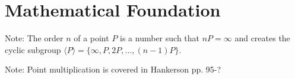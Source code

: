 \section{Mathematical Foundation}

Note: The order \(n\) of a point \(P\) is a number such that \(nP = \infty\) and creates
the cyclic subgroup \(\langle P \rangle = \{ \infty, P, 2P, ..., (n-1)P \} \).

Note: Point multiplication is covered in Hankerson pp. 95-?



